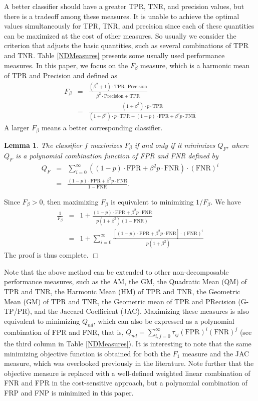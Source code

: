 \documentclass[15pt]{article}
\newcommand{\ben}{\begin{eqnarray*}}
\newcommand{\enn}{\end{eqnarray*}}
\newtheorem{lemma}{Lemma}
\newenvironment{proof}{{\em Proof.}}{$\Box$}
\begin{document}
A better classifier should have a greater TPR, TNR, and precision values, but there is a tradeoff among
these measures. It is unable to achieve the optimal values simultaneously for TPR, TNR, and precision
since each of these quantities can be maximized at the cost of other measures.
So usually we consider the criterion that adjusts the basic quantities, such as several combinations
of TPR and TNR. Table \ref{NDMeasures} presents some usually used performance measures.
In this paper, we focus on the $F_\beta$ measure, which is a harmonic mean of TPR and Precision and
defined as
\ben
F_\beta&=&\frac{(\beta^2+1)\cdot\mbox{TPR}\cdot\mbox{Precision}}{\beta^2\cdot\mbox{Precision}+\mbox{TPR}}\\
&=&\frac{(1+\beta^2)\cdot p\cdot\mbox{TPR}}{(1+\beta^2)\cdot p\cdot\mbox{TPR}
+(1-p)\cdot\mbox{FPR}+\beta^2p\cdot\mbox{FNR}}
\enn
A larger $F_\beta$ means a better corresponding classifier.

\begin{lemma}\label{Gbeta}
The classifier $f$ maximizes $F_\beta$ if and only if it minimizes $Q_F$, where $Q_F$ is a polynomial
combination function of FPR and FNR defined by
\ben
Q_F&=&\sum_{i=0}^\infty((1-p)\cdot\mbox{FPR}+\beta^2 p\cdot\mbox{FNR})\cdot(\mbox{FNR})^i \\
&=&\frac{(1-p)\cdot\mbox{FPR} +\beta^2 p\cdot\mbox{FNR}}{1-\mbox{FNR}}.
\enn
\end{lemma}

\begin{proof}
Since $F_\beta>0$, then maximizing $F_\beta$ is equivalent to minimizing ${1}/{F_\beta}$. We have
\ben
\frac{1}{F_\beta}
&=& 1+\frac{(1-p)\cdot\mbox{FPR}+\beta^2p\cdot\mbox{FNR}}{p(1+\beta^2)(1-\mbox{FNR})}\\
&=& 1+\sum_{i=0}^\infty\frac{[(1-p)\cdot\mbox{FPR}+\beta^2p\cdot\mbox{FNR}]\cdot(\mbox{FNR})^i}{p(1+\beta^2)}
\enn
The proof is thus complete.
\end{proof}

Note that the above method can be extended to other non-decomposable performance measures, 
such as the AM, the GM, the Quadratic Mean (QM) of TPR and TNR, the Harmonic Mean (HM) of TPR and TNR, 
the Geometric Mean (GM) of TPR and TNR, the Geometric mean of TPR and PRecision (G-TP/PR), and
the Jaccard Coefficient (JAC). Maximizing these measures is also equivalent to minimizing $Q_{nd}$,
which can also be expressed as a polynomial combination of FPR and FNR, that is, 
$Q_{nd}=\sum_{i,j=0}^\infty\tau_{ij}(\mbox{FPR})^i(\mbox{FNR})^j$
(see the third column in Table \ref{NDMeasures}).
It is interesting to note that the same minimizing objective function is obtained for both the $F_1$ measure 
and the JAC measure, which was overlooked previously in the literature.
Note further that the objective measure is replaced with a well-defined weighted linear combination of FNR 
and FPR in the cost-sensitive approach, but a polynomial combination of FRP and FNP is minimized in this paper.
\end{document}
